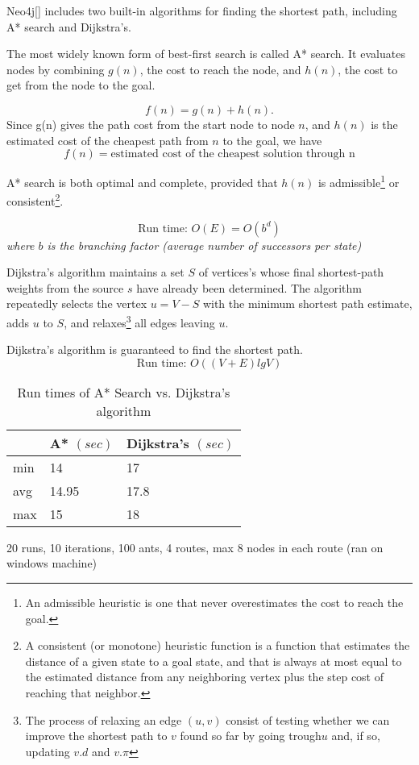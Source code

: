 Neo4j[] includes two built-in algorithms for finding the shortest path, including A* search\citep{russel10}  and Dijkstra's\citep{cormen09}. 

The most widely known form of best-first search is called A* search\cite[p.93-94]{russel10}. It evaluates nodes by combining $g(n)$, the cost to reach the node, and $h(n)$, the cost to get from the node to the goal.

$$ f(n) = g(n) + h(n).$$
Since g(n) gives the path cost from the start node to node $n$, and $h(n)$ is the estimated cost of the cheapest path from $n$ to the goal, we have
$$f(n) = \text{estimated cost of the cheapest solution through n} $$ 

A* search is both optimal and complete, provided that $h(n)$ is admissible\footnote{An admissible heuristic is one that never overestimates the cost to reach the goal.} or consistent\footnote{A consistent (or monotone) heuristic function is a function that estimates the distance of a given state to a goal state, and that is always at most equal to the estimated distance from any neighboring vertex plus the step cost of reaching that neighbor.}. 

$$ \text{Run time: } O(E) = O(b^d)$$
\textit{where $b$ is the branching factor (average number of successors per state)}

Dijkstra's algorithm \cite[p.658-662]{cormen09} maintains a set $S$ of vertices's whose final shortest-path weights from the source $s$ have already been determined. The algorithm repeatedly selects the vertex $u = V - S$ with the minimum shortest path estimate, adds $u$ to $S$, and relaxes\footnote{The process of relaxing an edge $(u,v)$ consist of testing whether we can improve the shortest path to $v$ found so far by going trough$u$ and, if so, updating $v.d$ and $v.\pi$ } all edges leaving $u$. 

Dijkstra's algorithm is guaranteed to find the shortest path\cite[p.~661]{cormen09}.
$$\text{Run time: } O((V + E)lg V)$$

\begin{table}[H]
    \begin{center}
        \begin{tabular}{|l|l|l|}
      \hline
      ~ & A* $(sec)$ & Dijkstra's $(sec)$ \\
      \hline
        min & 14 & 17 \\
        avg & 14.95 & 17.8 \\
        max & 15 & 18 \\
      \hline
        \end{tabular}
    \end{center}
    \caption {Run times of A* Search vs. Dijkstra's algorithm}
    \label{table:astarvsdijkstras}
    20 runs, 10 iterations, 100 ants, 4 routes, max 8 nodes in each route (ran on windows machine)
\end{table}

